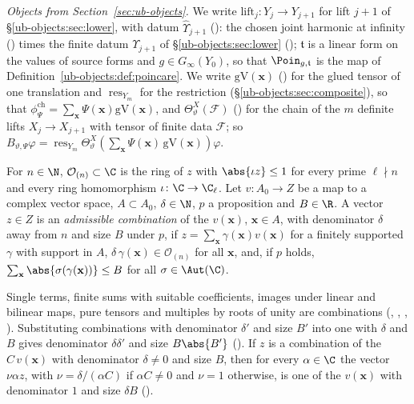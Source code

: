 \emph{Objects from Section~\ref{sec:ub-objects}.} We write $\mathrm{lift}_j\colon Y_j\to Y_{j+1}$
for lift $j+1$ of \S\ref{ub-objects:sec:lower}, with datum $\widehat\Upsilon_{j+1}$ (): the
chosen joint harmonic at infinity () times the finite datum $\Upsilon_{j+1}$
of \S\ref{ub-objects:sec:lower} ();
$\mathfrak t$ is a linear form on the values of source forms and $g\in G_\infty(Y_0)$, so that
$\Poin_{g,\mathfrak t}$ is the map of Definition~\ref{ub-objects:def:poincare}. We write $\mathrm{gV}(\mathbf x)$ () for
the glued tensor of one translation and $\operatorname{res}_{Y_m}$ for the restriction
(\S\ref{ub-objects:sec:composite}), so that
$\phi^{\mathrm{ch}}_\Psi=\sum_{\mathbf x}\Psi(\mathbf x)\mathrm{gV}(\mathbf x)$, and
$\Theta^X_\vartheta(\mathcal F)$ () for the chain of the $m$ definite
lifts $X_j\to X_{j+1}$ with tensor of finite data $\mathcal F$; so
$B_{\vartheta,\Psi}\varphi=\operatorname{res}_{Y_m}\Theta^X_\vartheta(\textstyle\sum_{\mathbf x}\Psi(\mathbf x)\,\mathrm{gV}(\mathbf x))\varphi$.

\begin{definition}\label{ub-seesaw:def:adm}
For $n\in\N$, $\mathcal O_{(n)}\subset\C$ is the ring of $z$ with $\abs{\iota z}\le1$ for every prime
$\ell\nmid n$ and every ring homomorphism $\iota\colon\C\to\C_\ell$. Let $v\colon A_0\to Z$ be a map
to a complex vector space, $A\subset A_0$, $\delta\in\N$, $p$ a proposition and $B\in\R$. A vector $z\in Z$
is an \emph{admissible combination} of the $v(\mathbf x)$, $\mathbf x\in A$, with denominator $\delta$ away from $n$ and
size $B$ under $p$, if $z=\sum_{\mathbf x} \gamma(\mathbf x)v(\mathbf x)$ for a finitely supported $\gamma$ with support in $A$,
$\delta\,\gamma(\mathbf x)\in\mathcal O_{(n)}$ for all $\mathbf x$, and, if $p$ holds,
$\sum_{\mathbf x}\abs{\sigma(\gamma(\mathbf x))}\le B$ for all $\sigma\in\Aut(\C)$.
\end{definition}

Single terms, finite sums with suitable coefficients, images under linear and bilinear maps, pure
tensors and multiples by roots of unity are combinations
(, ,
, ).
Substituting combinations with denominator $\delta'$ and size $B'$ into one with $\delta$ and $B$ gives
denominator $\delta\delta'$ and size $B\abs{B'}$ (). If $z$ is a combination
of the $C\,v(\mathbf x)$ with denominator $\delta\ne0$ and size $B$, then for every $\alpha\in\C$ the vector $\nu \alpha z$, with
$\nu=\delta/(\alpha C)$ if $\alpha C\ne0$ and $\nu=1$ otherwise, is one of the $v(\mathbf x)$ with denominator $1$ and size
$\delta B$ ().

